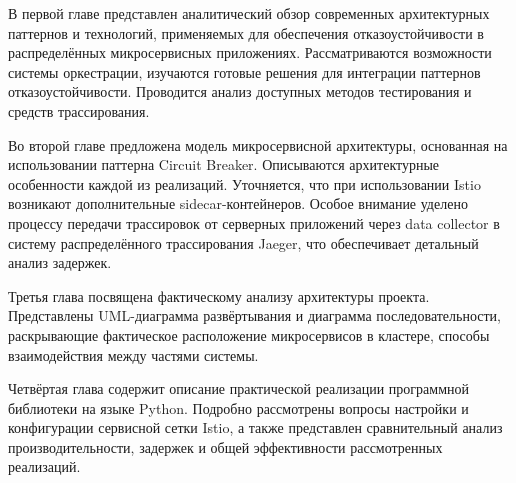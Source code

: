 В первой главе представлен аналитический обзор современных архитектурных паттернов и технологий, применяемых для обеспечения отказоустойчивости в распределённых микросервисных приложениях. Рассматриваются возможности системы оркестрации, изучаются готовые решения для интеграции паттернов отказоустойчивости. Проводится анализ доступных методов тестирования и средств трассирования. 

Во второй главе предложена модель микросервисной архитектуры, основанная на использовании паттерна Circuit Breaker. Описываются архитектурные особенности каждой из реализаций. Уточняется, что при использовании Istio возникают дополнительные sidecar-контейнеров. Особое внимание уделено процессу передачи трассировок от серверных приложений через data collector в систему распределённого трассирования Jaeger, что обеспечивает детальный анализ задержек.

Третья глава посвящена фактическому анализу архитектуры проекта. Представлены UML-диаграмма развёртывания и диаграмма последовательности, раскрывающие фактическое расположение микросервисов в кластере, способы взаимодействия между частями системы.

Четвёртая глава содержит описание практической реализации программной библиотеки на языке Python. Подробно рассмотрены вопросы настройки и конфигурации сервисной сетки Istio, а также представлен сравнительный анализ производительности, задержек и общей эффективности рассмотренных реализаций.



